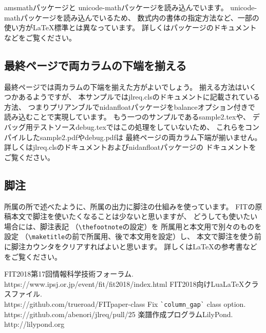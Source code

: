 \documentclass{FITpaper}
\begin{document}
amsmathパッケージと
unicode-mathパッケージを読み込んでいます。
unicode-mathパッケージを読み込んでいるため、
数式内の書体の指定方法など、一部の使い方が\LaTeX 標準とは異なっています。
詳しくはパッケージのドキュメントなどをご覧ください。

\subsection{最終ページで両カラムの下端を揃える}

最終ページでは両カラムの下端を揃えた方がよいでしょう。
揃える方法はいくつかあるようですが、
本サンプルではjlreq.clsのドキュメントに記載されている方法、
つまりプリアンブルでnidanfloatパッケージをbalanceオプション付きで
読み込むことで実現しています。
もう一つのサンプルであるsample2.texや、
デバッグ用テストソースdebug.texではこの処理をしていないため、
これらをコンパイルしたsample2.pdfやdebug.pdfは
最終ページの両カラム下端が揃いません。
詳しくはjlreq.clsのドキュメントおよびnidanfloatパッケージの
ドキュメントをご覧ください。

\subsection{脚注}

所属の所で述べたように、所属の出力に脚注の仕組みを使っています。
FITの原稿本文で脚注を使いたくなることは少ないと思いますが、
どうしても使いたい場合には、脚注表記
（\texttt{\textbackslash thefootnote}の設定）を
所属用と本文用で別々のものを設定
（\texttt{\textbackslash maketitle}の前で所属用、後で本文用を設定）し、
本文で脚注を使う前に脚注カウンタをクリアすればよいと思います。
詳しくは\LaTeX の参考書などをご覧ください。


\begin{thebibliography}{9}

  FIT2018第17回情報科学技術フォーラム. \\
  https://www.ipsj.or.jp/event/fit/fit2018/index.html
  FIT2018向けLua\LaTeX クラスファイル. \\
  https://github.com/trueroad/FITpaper-class
  Fix \verb|`column_gap`| class option. \\
  https://github.com/abenori/jlreq/pull/25
  楽譜作成プログラムLilyPond. \\
  http://lilypond.org

\end{thebibliography}
\end{document}
